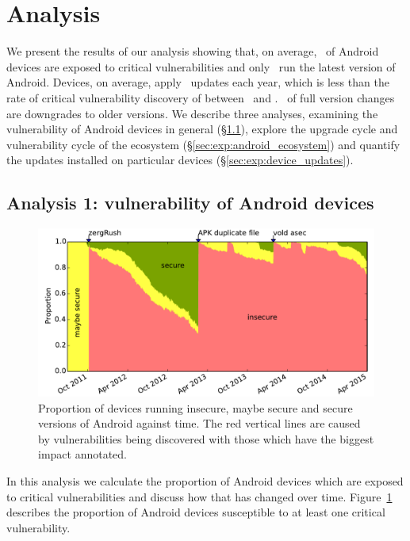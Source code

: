 \documentclass{llncs}
\begin{document}
\section{Analysis}
\label{sec:results}
We present the results of our analysis showing that, on average, \daMeanInsecurityPerc\ of Android devices are exposed to critical vulnerabilities and only \daUpdatednessPerc\ run the latest version of Android.
Devices, on average, apply \daUpdatesPerYear\ updates each year, which is less than the rate of critical vulnerability discovery of between \avoVulnsPerYearAllAndroid\ and \avoVulnsPerYear.
\daPercUpdatesDowngrades\ of full version changes are downgrades to older versions.
We describe three analyses, examining the vulnerability of Android devices in general (\S\ref{sec:exp:versionsecurity}), explore the upgrade cycle and vulnerability cycle of the ecosystem (\S\ref{sec:exp:android_ecosystem}) and quantify the updates installed on particular devices (\S\ref{sec:exp:device_updates}).

\subsection{Analysis 1: vulnerability of Android devices}\label{sec:exp:versionsecurity}
\begin{figure}[h]
\centering
\includegraphics[width=\columnwidth]{figures/proportioninsecure}
\caption{Proportion of devices running insecure, maybe secure and secure versions of Android against time.
The red vertical lines are caused by vulnerabilities being discovered with those which have the biggest impact annotated.
}
\label{fig:proportioninsecure}
\end{figure}
In this analysis we calculate the proportion of Android devices which are exposed to critical vulnerabilities and discuss how that has changed over time.
Figure~\ref{fig:proportioninsecure} describes the proportion of Android devices susceptible to at least one critical vulnerability.
\end{document}

